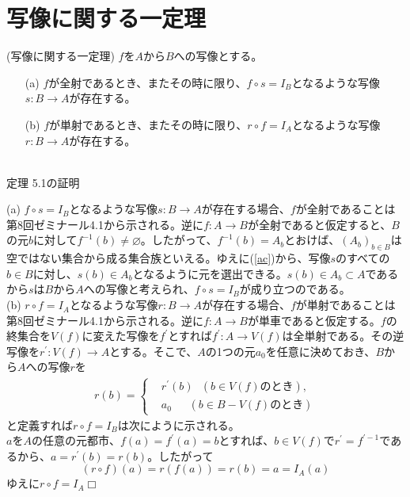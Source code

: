 \documentclass[a4j]{jsarticle}
\def \QED{\hfill $\Box$}%
\begin{document}
\section{写像に関する一定理}

\begin{itembox}[l]{ (写像に関する一定理)}
	$f$を$A$から$B$への写像とする。
	\begin{itemize}
		\item[(a)] $f$が全射であるとき、またその時に限り、$f \circ s = I_B$となるような写像$s : B \rightarrow A$が存在する。
		\item[(b)] $f$が単射であるとき、またその時に限り、$r \circ f = I_A$となるような写像$r : B \rightarrow A$が存在する。
	\end{itemize}
\end{itembox}\\

 定理 5.1の証明

(a) $f \circ s = I_B$となるような写像$s : B \rightarrow A$が存在する場合、$f$が全射であることは第8回ゼミナール4.1から示される。逆に$f : A \rightarrow B$が全射であると仮定すると、$B$の元$b$に対して$f^{-1}(b) \neq \varnothing$。したがって、$f^{-1}(b) = A_b$とおけば、$(A_b)_{b \in B}$は空ではない集合から成る集合族といえる。ゆえに(\ref{ac})から、写像$s$のすべての$b \in B$に対し、$s(b) \in A_b$となるように元を選出できる。$s(b) \in A_b \subset A$であるから$s$は$B$から$A$への写像と考えられ、$f \circ s = I_B$が成り立つのである。\\

(b) $r \circ f = I_A$となるような写像$r : B \rightarrow A$が存在する場合、$f$が単射であることは第8回ゼミナール4.1から示される。逆に$f : A \rightarrow B$が単車であると仮定する。$f$の終集合を$V(f)$に変えた写像を$f^\prime$とすれば$f^\prime : A \rightarrow V(f)$は全単射である。その逆写像を$r^\prime : V(f) \rightarrow A$とする。そこで、$A$の1つの元$a_0$を任意に決めておき、$B$から$A$への写像$r$を
\begin{align*}
	r(b) =  \begin{cases}
		         & r^\prime(b)\:\:\:(b \in V(f)\mbox{のとき}),    \\
		         & a_0\:\:\:\:\:\:\:(b \in B - V(f)\mbox{のとき})
	        \end{cases}
\end{align*}
と定義すれば$r \circ f = I_B$は次にように示される。\\
$a$を$A$の任意の元都市、$f(a)=f^\prime(a)=b$とすれば、$b \in V(f)$で$r^\prime = f^{\prime-1}$であるから、$a=r^\prime(b)=r(b)$。したがって$$(r \circ f)(a) = r(f(a)) = r(b) = a = I_A(a)$$ゆえに$r \circ f = I_A$\QED\\
\end{document}
